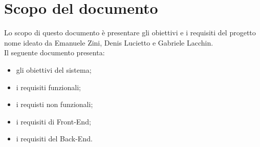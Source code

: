 \section*{Scopo del documento}
Lo scopo di questo documento è presentare gli obiettivi e i requisiti del progetto nome ideato da Emanuele Zini, Denis Lucietto e Gabriele Lacchin.\\
Il seguente documento presenta:
\begin{itemize}
    \item gli obiettivi del sistema;
    \item i requisiti funzionali;
    \item i requisti non funzionali;
    \item i requisiti di Front-End;
    \item i requisiti del Back-End.
\end{itemize}